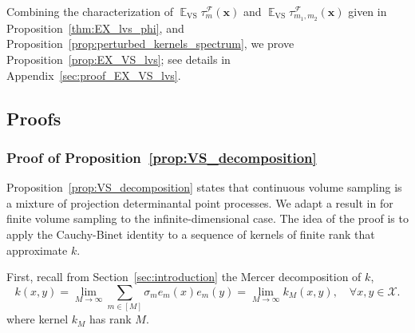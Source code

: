 \documentclass[twoside,11pt]{book}
\DeclareMathOperator{\VS}{\mathrm{VS}}
\DeclareMathOperator{\EX}{\mathbb{E}}
\DeclareMathOperator{\F}{\mathcal{F}}
\begin{document}
Combining the characterization of $\EX_{\VS} \tau_{m}^{\F}(\bm{x})$ and $\EX_{\VS} \tau_{m_{1},m_{2}}^{\F}(\bm{x})$ given in Proposition~\ref{thm:EX_lvs_phi}, and Proposition~\ref{prop:perturbed_kernels_spectrum}, we prove Proposition~\ref{prop:EX_VS_lvs}; see details in Appendix~\ref{sec:proof_EX_VS_lvs}.



\subsection{Proofs}


 \subsubsection{Proof of Proposition~\ref{prop:VS_decomposition}}\label{sec:proof_VS_decomposition}

Proposition~\ref{prop:VS_decomposition} states that continuous volume sampling is a mixture of projection determinantal point processes. We adapt a result in \citep[Chapter 5]{KuTa12} for finite volume sampling to the infinite-dimensional case. The idea of the proof is to apply the Cauchy-Binet identity to a sequence of kernels of finite rank that approximate $k$.

First, recall from Section~\ref{sec:introduction} the Mercer decomposition of $k$,
\begin{equation}\label{eq:Mercer_decomposition_1}
k(x,y) = \lim_{M\rightarrow \infty}\sum\limits_{m\in [M]} \sigma_{m} e_{m}(x)e_{m}(y) = \lim_{M\rightarrow \infty} k_M(x,y), \quad\forall x,y\in\mathcal{X}.
\end{equation}
where kernel $k_M$ has rank $M$.
\end{document}
